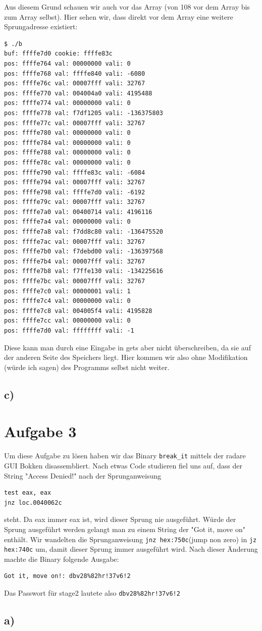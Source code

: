 \documentclass[10pt,a4paper]{article}
\begin{document}
Aus diesem Grund schauen wir auch vor das Array (von 108 vor dem Array bis zum Array selbst). Hier sehen wir, dass direkt vor dem Array eine weitere Sprungadresse existiert:
\begin{verbatim}
$ ./b
buf: ffffe7d0 cookie: ffffe83c
pos: ffffe764 val: 00000000 vali: 0
pos: ffffe768 val: ffffe840 vali: -6080
pos: ffffe76c val: 00007fff vali: 32767
pos: ffffe770 val: 004004a0 vali: 4195488
pos: ffffe774 val: 00000000 vali: 0
pos: ffffe778 val: f7df1205 vali: -136375803
pos: ffffe77c val: 00007fff vali: 32767
pos: ffffe780 val: 00000000 vali: 0
pos: ffffe784 val: 00000000 vali: 0
pos: ffffe788 val: 00000000 vali: 0
pos: ffffe78c val: 00000000 vali: 0
pos: ffffe790 val: ffffe83c vali: -6084
pos: ffffe794 val: 00007fff vali: 32767
pos: ffffe798 val: ffffe7d0 vali: -6192
pos: ffffe79c val: 00007fff vali: 32767
pos: ffffe7a0 val: 00400714 vali: 4196116
pos: ffffe7a4 val: 00000000 vali: 0
pos: ffffe7a8 val: f7dd8c80 vali: -136475520
pos: ffffe7ac val: 00007fff vali: 32767
pos: ffffe7b0 val: f7debd00 vali: -136397568
pos: ffffe7b4 val: 00007fff vali: 32767
pos: ffffe7b8 val: f7ffe130 vali: -134225616
pos: ffffe7bc val: 00007fff vali: 32767
pos: ffffe7c0 val: 00000001 vali: 1
pos: ffffe7c4 val: 00000000 vali: 0
pos: ffffe7c8 val: 004005f4 vali: 4195828
pos: ffffe7cc val: 00000000 vali: 0
pos: ffffe7d0 val: ffffffff vali: -1
\end{verbatim}
Diese kann man durch eine Eingabe in gets aber nicht überschreiben, da sie auf der anderen Seite des Speichers liegt. Hier kommen wir also ohne Modifikation (würde ich sagen) des Programms selbst nicht weiter.

\subsection*{c)}
\section*{Aufgabe 3}
Um diese Aufgabe zu lösen haben wir das Binary \texttt{break\_it} mittels der radare GUI Bokken disassembliert. Nach etwas Code studieren fiel uns auf, dass der String "Access Denied!" nach der Sprunganweisung 
\begin{verbatim}
test eax, eax
jnz loc.0040062c
\end{verbatim}  
steht. Da eax immer eax ist, wird dieser Sprung nie ausgeführt. Würde der Sprung ausgeführt werden gelangt man zu einem String der "Got it, move on" enthält. Wir wandelten die Sprunganweisung \texttt{jnz hex:750c}(jump non zero) in \texttt{jz hex:740c} um, damit dieser Sprung immer ausgeführt wird.
Nach dieser Änderung machte die Binary folgende Ausgabe:
\begin{verbatim}
Got it, move on!: dbv28%82hr!37v6!2
\end{verbatim}
Das Passwort für stage2 lautete also \texttt{dbv28\%82hr!37v6!2}

\subsection*{a)}
\end{document}
